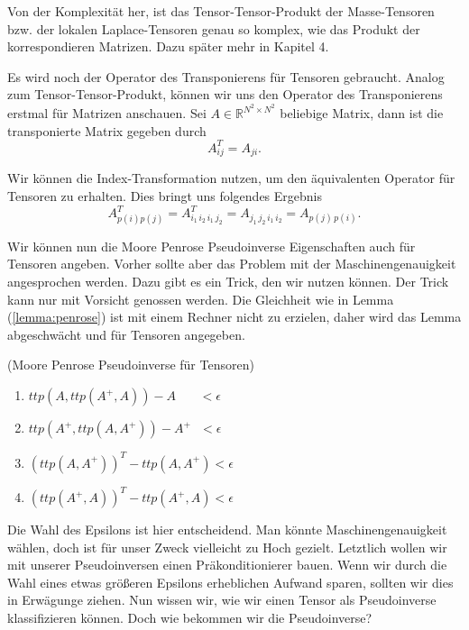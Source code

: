 Von der Komplexität her, ist das Tensor-Tensor-Produkt der Masse-Tensoren bzw. der lokalen Laplace-Tensoren genau so komplex, wie das Produkt der korrespondieren Matrizen. Dazu später mehr in Kapitel 4.

Es wird noch der Operator des Transponierens für Tensoren gebraucht. Analog zum Tensor-Tensor-Produkt, können wir uns den Operator des Transponierens erstmal für Matrizen anschauen.
Sei $A \in \mathbb{R}^{N^2 \times N^2}$ beliebige Matrix, dann ist die transponierte Matrix gegeben durch
\begin{equation}
A_{ij}^T = A_{ji}.
\end{equation}

Wir können die Index-Transformation nutzen, um den äquivalenten Operator für Tensoren zu erhalten. Dies bringt uns folgendes Ergebnis
\begin{equation}
A_{p(i)p(j)}^T=A_{i_1 \, i_2 \, i_1 \, j_2}^T=A_{ j_1 \, j_2 \, i_1 \, i_2}=A_{p(j) \,p(i)}.
\end{equation}

Wir können nun die Moore Penrose Pseudoinverse Eigenschaften auch für Tensoren angeben. Vorher sollte aber das Problem mit der Maschinengenauigkeit angesprochen werden. 
Dazu gibt es ein Trick, den wir nutzen können. Der Trick kann nur mit Vorsicht genossen werden. Die Gleichheit wie in Lemma (\ref{lemma:penrose}) ist mit einem Rechner nicht zu erzielen, daher wird das Lemma abgeschwächt und für Tensoren angegeben. 
\begin{Lemma} (Moore Penrose Pseudoinverse für Tensoren)
\begin{enumerate}
\item $ttp(A,ttp(A^{+},A))-A \, \, \, \, \, \, \, \, \, \, \, < \epsilon$
\item $ttp(A^{+},ttp(A,A^{+}))-A^{+} \, \,  \, \, < \epsilon $ 
\item $(ttp(A,A^{+}))^{T}-ttp(A,A^{+}) < \epsilon $ 
\item $(ttp(A^{+},A))^{T}-ttp(A^{+},A) < \epsilon $ 
\end{enumerate}
\end{Lemma}

Die Wahl des Epsilons ist hier entscheidend. Man könnte Maschinengenauigkeit wählen, doch ist für unser Zweck vielleicht zu Hoch gezielt. Letztlich wollen wir mit unserer Pseudoinversen einen Präkonditionierer bauen. Wenn wir durch die Wahl eines etwas größeren Epsilons erheblichen Aufwand sparen, sollten wir dies in Erwägunge ziehen.
Nun wissen wir, wie wir einen Tensor als Pseudoinverse klassifizieren können. Doch wie bekommen wir die Pseudoinverse?

